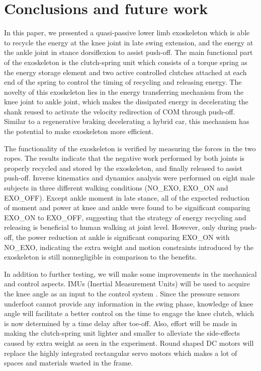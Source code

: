 \documentclass[twocolumn,cleanfoot,10pt]{asme2ej}
\begin{document}
\section{Conclusions and future work}
\label{sec:discussion}
In this paper, we presented a quasi-passive lower limb exoskeleton which is able to recycle the energy at the knee joint in late swing extension, and the energy at the ankle joint in stance dorsiflexion to assist push-off. The main functional part of the exoskeleton is the clutch-spring unit which consists of a torque spring as the energy storage element and two active controlled clutches attached at each end of the spring to control the timing of recycling and releasing energy. The novelty of this exoskeleton lies in the energy transferring mechanism from the knee joint to ankle joint, which makes the dissipated energy in decelerating the shank reused to activate the velocity redirection of COM through push-off. Similar to a regenerative braking decelerating a hybrid car, this mechanism has the potential to make exoskeleton more efficient.

The functionality of the exoskeleton is verified by measuring the forces in the two ropes. The results indicate that the negative work performed by both joints is properly recycled and stored by the exoskeleton, and finally released to assist push-off. Inverse kinematics and dynamics analysis were performed on eight male subjects in three different walking conditions (NO\_EXO, EXO\_ON and EXO\_OFF). Except ankle moment in late stance, all of the expected reduction of moment and power at knee and ankle were found to be significant comparing EXO\_ON to EXO\_OFF, suggesting that the strategy of energy recycling and releasing is beneficial to human walking at joint level. However, only during push-off, the power reduction at ankle is significant comparing EXO\_ON with NO\_EXO, indicating the extra weight and motion constraints introduced by the exoskeleton is still nonnegligible in comparison to the benefits.

In addition to further testing, we will make some improvements in the mechanical and control aspects. IMUs (Inertial Measurement Units) will be used to acquire the knee angle as an input to the control system \cite{IMU2}. Since the pressure sensors underfoot cannot provide any information in the swing phase, knowledge of knee angle will facilitate a better control on the time to engage the knee clutch, which is now determined by a time delay after toe-off. Also, effort will be made in making the clutch-spring unit lighter and smaller to alleviate the side-effects caused by extra weight as seen in the experiment. Round shaped DC motors will replace the highly integrated rectangular servo motors which makes a lot of spaces and materials wasted in the frame. 
\end{document}
